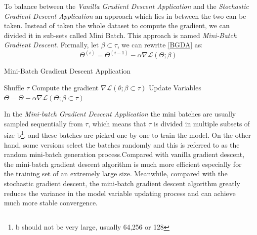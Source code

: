 \documentclass[conference]{IEEEtran}
\begin{document}
To balance between the \textit{Vanilla Gradient Descent Application} and the  \textit{Stochastic Gradient Descent Application} an approach which lies in between the two can be taken. Instead of taken the whole dataset to compute the gradient, we can divided it in sub-sets called Mini Batch. This approach is named \textit{Mini-Batch Gradient Descent}. 
Formally, let $\beta \subset \tau$, we can rewrite \eqref{BGDA} as:
\begin{equation}
    \Theta^{(i)} = \Theta^{(i-1)} - \alpha\nabla\mathscr{L}(\Theta;\beta )\label{eq:MBGDA}
\end{equation}

\begin{algorithm}
\caption{Mini-Batch Gradient Descent Application}\label{MBGDA}
\begin{algorithmic}[1]
\State Shuffle $\tau$
\State Compute the gradient $\nabla\mathscr{L}(\theta;\beta \subset \tau)$
\State Update Variables $\Theta = \Theta -\alpha\nabla\mathscr{L}(\Theta;\beta \subset \tau)$
\EndFor
\EndFor
{}
\end{algorithmic}
\end{algorithm}
In the \textit{Mini-batch Gradient Descent Application} the mini batches are usually sampled sequentially from $\tau$, which means that $\tau$ is divided in multiple subsets of size b\footnote{b should not be very large, usually 64,256 or 128}, and these batches are picked one by one to train the model. On the other hand, some versions select the batches randomly and this is referred to as the random mini-batch generation process.Compared with vanilla gradient descent, the mini-batch gradient descent algorithm is much more efficient especially for the training set of an extremely large size. Meanwhile, compared with the stochastic gradient descent, the mini-batch gradient descent algorithm greatly reduces the variance in the model variable updating process and can achieve much more stable convergence.\cite{JZ2019}
\end{document}
